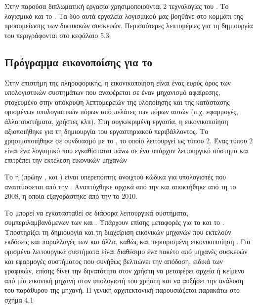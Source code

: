Στην παρούσα διπλωματική εργασία χρησιμοποιούνται 2 τεχνολογίες του . Το  λογισμικό και το . Τα δύο αυτά εργαλεία λογισμικού μας βοηθάνε στο κομμάτι της προσομείωσης των δικτυακών συσκευών. Περισσότερες λεπτομέριες για τη δημιουργία του  περιγράφονται στο κεφάλαιο 5.3

\subsection{Πρόγραμμα εικονοποίσης για το }

Στην επιστήμη της πληροφορικής, η εικονικοποίηση  είναι ένας ευρύς όρος 
των υπολογιστικών συστημάτων που αναφέρεται σε έναν μηχανισμό αφαίρεσης, 
στοχευμένο στην απόκρυψη λεπτομερειών της υλοποίησης και της κατάστασης
ορισμένων υπολογιστικών πόρων από πελάτες των πόρων αυτών 
(π.χ. εφαρμογές, άλλα συστήματα, χρήστες κλπ). 
Στη συγκεκριμένη εργασία, η εικονικοποίηση αξιοποιήθηκε για τη δημιουργία του εργαστηριακού περιβάλλοντος. Το  χρησιμοποιήθηκε σε συνδυασμό με το , το οποίο λειτουργεί ως  τύπου 2. Ένας  τύπου 2 είναι ένα λογισμικό που εγκαθίσταται πάνω σε ένα υπάρχον λειτουργικό σύστημα και επιτρέπει την εκτέλεση εικονικών μηχανών

Το  ή  (πρώην ,  και ) είναι υπερεπόπτης
ανοιχτού κώδικα για υπολογιστές  που αναπτύσσεται από την .
Αναπτύχθηκε αρχικά από την 
και αποκτήθηκε από τη  το 2008, η οποία εξαγοράστηκε από την  το 2010.

Το  μπορεί να εγκατασταθεί σε διάφορα λειτουργικά συστήματα, συμπεριλαμβανόμενων των  και .
Υπάρχουν επίσης μεταφορές για το  και το .
Υποστηρίζει τη δημιουργία και τη διαχείριση εικονικών μηχανών που εκτελούν εκδόσεις και παραλλαγές των 
και άλλα, καθώς και περιορισμένη εικονικοποίηση .
Για ορισμένα λειτουργικά συστήματα είναι διαθέσιμο ένα πακέτο  από μηχανές συσκευών και εφαρμογές συστήματος
που συνήθως βελτιώνει την απόδοση, ειδικά των γραφικών, επίσης δίνει την δηνατότητα στον χρήστη να μεταφέρει αρχεία ή κείμενο από μία εικονική μηχανή στον υπολογιστή του χρήστη και να αυξήσει την ανάλυση του παράθυρου της μηχανή. 
Η γενική αρχιτεκτονική παρουσιάζεται παρακάτω στο σχήμα 4.1

